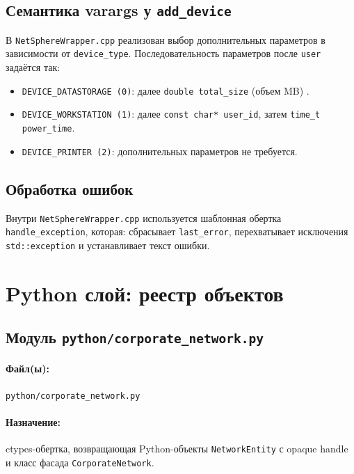 \documentclass[14pt,a4paper]{extarticle}
\begin{document}
\subsection{Семантика varargs у \texttt{add\_device}}
В \texttt{NetSphereWrapper.cpp} реализован выбор дополнительных параметров в зависимости от \texttt{device\_type}.
Последовательность параметров после \texttt{user} задаётся так:
\begin{itemize}
  \item \texttt{DEVICE\_DATASTORAGE (0)}: далее \texttt{double total\_size} (объем MB) .
  \item \texttt{DEVICE\_WORKSTATION (1)}: далее \texttt{const char* user\_id}, затем \texttt{time\_t power\_time}.
  \item \texttt{DEVICE\_PRINTER (2)}: дополнительных параметров не требуется.
\end{itemize}

\subsection{Обработка ошибок}
Внутри \texttt{NetSphereWrapper.cpp} используется шаблонная обертка \texttt{handle\_exception}, которая:
сбрасывает \texttt{last\_error}, перехватывает исключения \texttt{std::exception} и устанавливает текст ошибки.

\section{Python слой: реестр объектов}
\subsection{Модуль \texttt{python/corporate\_network.py}}
\paragraph{Файл(ы):} \texttt{python/corporate\_network.py}
\paragraph{Назначение:} ctypes-обертка, возвращающая Python-объекты \texttt{NetworkEntity} с opaque handle и класс фасада \texttt{CorporateNetwork}.
\end{document}
